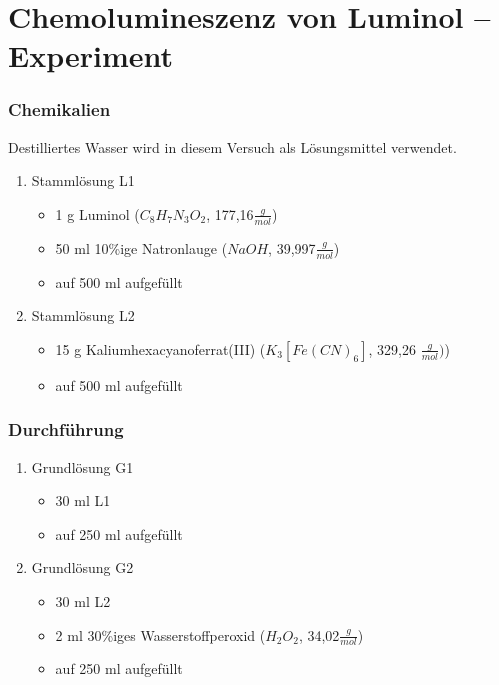 \section{Chemolumineszenz von Luminol -- Experiment}

\subsubsection*{Chemikalien}

Destilliertes Wasser wird in diesem Versuch als Lösungsmittel verwendet.
\begin{enumerate}

\item Stammlösung L1
\begin{itemize}
\item 1 g Luminol ($C_8H_7N_3O_2$, 177,16$\frac{g}{mol}$)
\item 50 ml 10\%ige Natronlauge ($NaOH$, 39,997$\frac{g}{mol}$)
\item auf 500 ml aufgefüllt
\end{itemize}

\item Stammlösung L2
\begin{itemize}
\item 15 g Kaliumhexacyanoferrat(III) ($K_3[Fe(CN)_6]$, 329,26 $\frac{g}{mol})$)
\item auf 500 ml aufgefüllt 
\end{itemize}
\end{enumerate}

\subsubsection*{Durchführung} 

\begin{enumerate}

\item Grundlösung G1
\begin{itemize}
\item 30 ml L1 
\item auf 250 ml aufgefüllt
\end{itemize}

\item Grundlösung G2
\begin{itemize}
\item 30 ml L2 
\item 2 ml 30\%iges Wasserstoffperoxid ($H_2O_2$, 34,02$\frac{g}{mol}$)
\item auf 250 ml aufgefüllt 
\end{itemize}
\end{enumerate}

